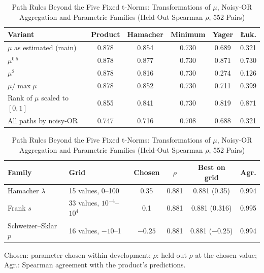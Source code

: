 \documentclass[journal]{IEEEtran}
\begin{document}
\setcounter{table}{17}\begin{table}[!t]
\caption{Path Rules Beyond the Five Fixed t-Norms: Transformations of $\mu$, Noisy-OR Aggregation and Parametric Families (Held-Out Spearman $\rho$, 552 Pairs)}
\centering
\scriptsize
\setlength{\tabcolsep}{2.5pt}
\begin{tabular}{@{}l c c c c c@{}}
\toprule
Variant & Product & Hamacher & Minimum & Yager & {\L}uk.\\
\midrule
$\mu$ as estimated (main) & 0.878 & 0.854 & 0.730 & 0.689 & 0.321\\
$\mu^{0.5}$ & 0.878 & 0.877 & 0.730 & 0.871 & 0.730\\
$\mu^2$ & 0.878 & 0.816 & 0.730 & 0.274 & 0.126\\
$\mu/\max\mu$ & 0.878 & 0.852 & 0.730 & 0.711 & 0.399\\
Rank of $\mu$ scaled to $[0,1]$ & 0.855 & 0.841 & 0.730 & 0.819 & 0.871\\
All paths by noisy-OR & 0.747 & 0.716 & 0.708 & 0.688 & 0.321\\
\bottomrule
\end{tabular}

\smallskip
\begin{tabular}{@{}l l c c c c@{}}
\toprule
Family & Grid & Chosen & $\rho$ & Best on grid & Agr.\\
\midrule
Hamacher $\lambda$ & 15 values, 0--100 & 0.35 & 0.881 & 0.881 (0.35) & 0.994\\
Frank $s$ & 33 values, $10^{-4}$--$10^4$ & 0.1 & 0.881 & 0.881 (0.316) & 0.995\\
Schweizer--Sklar $p$ & 16 values, $-10$--1 & $-0.25$ & 0.881 & 0.881 ($-0.25$) & 0.994\\
\bottomrule
\end{tabular}

\smallskip
\parbox{\columnwidth}{\scriptsize Chosen: parameter chosen within development; $\rho$: held-out $\rho$ at the chosen value; Agr.: Spearman agreement with the product's predictions.}
\end{table}
\end{document}
